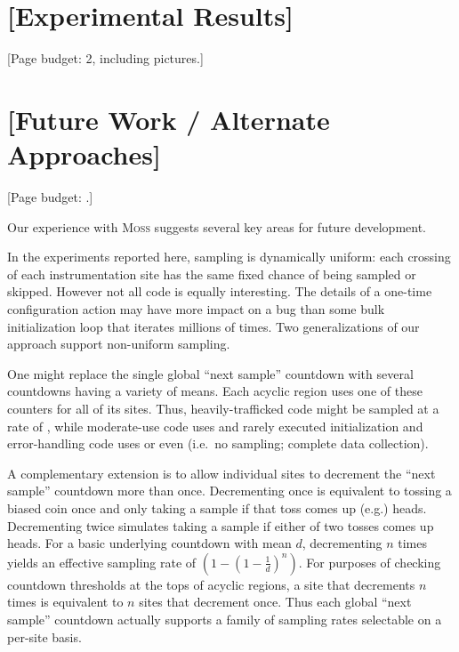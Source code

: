 \documentclass{sig-alternate}
\newcommand{\moss}{\textsc{Moss}\xspace}
\newcommand{\placeholder}[1]{{\color[cmyk]{0,0.61,0.87,0}[#1]}}
\begin{document}


\section{\placeholder{Experimental Results}}
\label{sec:experiments:results}
\placeholder{Page budget: 2, including pictures.}


\section{\placeholder{Future Work / Alternate Approaches}}
\label{sec:future-work}

\placeholder{Page budget: .}

Our experience with \moss suggests several key areas for future
development.

In the experiments reported here, sampling is dynamically uniform:
each crossing of each instrumentation site has the same fixed chance
of being sampled or skipped.  However not all code is equally
interesting.  The details of a one-time configuration action may have
more impact on a bug than some bulk initialization loop that iterates
millions of times.  Two generalizations of our approach support
non-uniform sampling.

One might replace the single global ``next sample'' countdown with
several countdowns having a variety of means.  Each acyclic region
uses one of these counters for all of its sites.  Thus,
heavily-trafficked code might be sampled at a rate of
, while moderate-use code uses  and
rarely executed initialization and error-handling code uses
 or even  (i.e.\ no sampling; complete
data collection).

A complementary extension is to allow individual sites to decrement
the ``next sample'' countdown more than once.  Decrementing once is
equivalent to tossing a biased coin once and only taking a sample if
that toss comes up (e.g.) heads.  Decrementing twice simulates taking
a sample if either of two tosses comes up heads.  For a basic
underlying countdown with mean $d$, decrementing $n$ times yields an
effective sampling rate of $(1 - (1 - \frac{1}{d})^n)$.  For purposes
of checking countdown thresholds at the tops of acyclic regions, a
site that decrements $n$ times is equivalent to $n$ sites that
decrement once.  Thus each global ``next sample'' countdown actually
supports a family of sampling rates selectable on a per-site basis.
\end{document}
